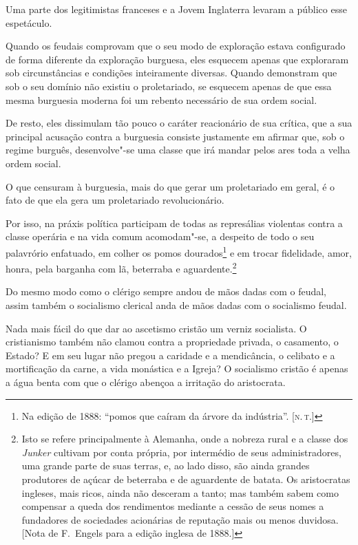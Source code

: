 Uma parte dos legitimistas franceses e a Jovem Inglaterra levaram a
público esse espetáculo.

Quando os feudais comprovam que o seu modo de exploração estava
configurado de forma diferente da exploração burguesa, eles esquecem
apenas que exploraram sob circunstâncias e condições inteiramente
diversas. Quando demonstram que sob o seu domínio não existiu o
proletariado, se esquecem apenas de que essa mesma burguesia
moderna foi um rebento necessário de sua ordem social.

De resto, eles dissimulam tão pouco o caráter reacionário de sua crítica,
que a sua principal acusação contra a burguesia consiste justamente em
afirmar que, sob o regime burguês, desenvolve"-se uma classe que irá
mandar pelos ares toda a velha ordem social.

O que censuram à burguesia, mais do que gerar um proletariado em geral,
é o fato de que ela gera um proletariado revolucionário.

Por isso, na práxis política participam de todas as represálias
violentas contra a classe operária e na vida comum acomodam"-se, a
despeito de todo o seu palavrório enfatuado, em colher os pomos
dourados\footnote{Na edição de 1888: ``pomos que caíram da árvore da indústria''. [\textsc{n.\,t.}]} e em trocar fidelidade, amor, honra, pela barganha com lã,
beterraba e
aguardente.\footnote{Isto se refere principalmente à Alemanha, onde 
a nobreza rural e a classe dos \textit{Junker} cultivam por conta própria, 
por intermédio de seus administradores, uma grande parte de suas terras, 
e, ao lado disso, são ainda grandes produtores de açúcar de beterraba e 
de aguardente de batata. Os aristocratas ingleses, mais ricos, ainda não desceram 
a tanto; mas também sabem como compensar a queda dos rendimentos mediante 
a cessão de seus nomes a fundadores de sociedades acionárias de reputação 
mais ou menos duvidosa. [Nota de F.~Engels para a edição inglesa de 1888.]}

Do mesmo modo como o clérigo sempre andou de mãos dadas com o feudal,
assim também o socialismo clerical anda de mãos dadas com o socialismo
feudal.

Nada mais fácil do que dar ao ascetismo cristão um verniz socialista. O
cristianismo também não clamou contra a propriedade privada, o
casamento, o Estado? E em seu lugar não pregou a caridade e a
mendicância, o celibato e a mortificação da carne, a vida monástica e a
Igreja? O socialismo cristão é apenas a água benta com que o clérigo
abençoa a irritação do aristocrata.

